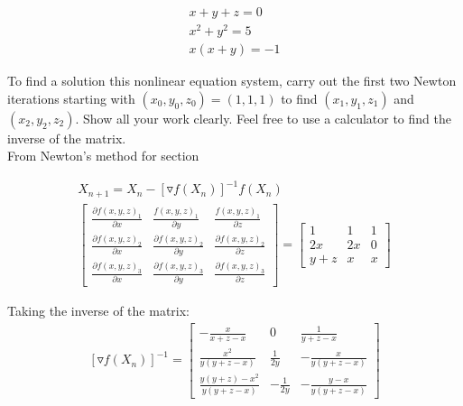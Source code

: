 \documentclass{article}
\begin{document}
\begin{gather*}
  x + y + z = 0 \\
  x^2 + y^2 = 5 \\
  x(x+y) = -1
\end{gather*}

To find a solution this nonlinear equation system, carry out the first two Newton iterations starting with $(x_{0}, y_{0}, z_{0}) = (1, 1, 1)$ to find $ (x_{1}, y_{1}, z_{1})$ and $(x_{2}, y_{2}, z_{2})$. Show all your work clearly. Feel free to use a calculator to find the inverse of the matrix.\\

\noindent
From Newton's method for section

\begin{gather*}
  X_{n+1} = X_{n} - \left[ \triangledown f(X_{n})\right]^{-1}f(X_{n}) \\
  \begin{bmatrix}
    \frac{\partial f(x,y,z)_{1}}{\partial x}& \frac{f(x,y,z)_{1}}{\partial y} & \frac{f(x,y,z)_{1}}{\partial z} \\\frac{\partial f(x,y,z)_{2}}{\partial x}  & \frac{\partial f(x,y,z)_{2}}{\partial y} & \frac{\partial f(x,y,z)_{2}}{\partial z} \\ \frac{\partial f(x,y,z)_{3}}{\partial x} & \frac{\partial f(x,y,z)_{3}}{\partial y} &\frac{\partial f(x,y,z)_{3}}{\partial z}
  \end{bmatrix} =
  \begin{bmatrix}
      1 & 1 & 1\\
      2x & 2x & 0 \\
      y + z & x & x
  \end{bmatrix}
\end{gather*}


Taking the inverse of the matrix:
\begin{gather*}
  \left[ \triangledown f(X_{n})\right]^{-1} =
  \begin{bmatrix}
      -\frac{x}{x+z-x} & 0 & \frac{1}{y+z-x}\\
      \frac{x^{2}}{y(y+z-x)} &\frac{1}{2y} & -\frac{x}{y(y+z-x)} \\
      \frac{y(y+z) - x^{2}}{y(y+z-x)} & -\frac{1}{2y} & -\frac{y-x}{y(y+z-x)}
    \end{bmatrix}
\end{gather*}
\end{document}
